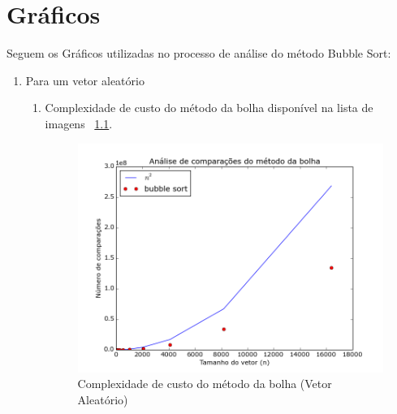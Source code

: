 \documentclass[12pt,a4paper,twoside]{report}
\begin{document}
\chapter{Gráficos}

Seguem os Gráficos utilizadas no processo de análise do método Bubble Sort:
\begin{enumerate}

	\item Para um vetor aleatório
	\begin{enumerate}
		\item Complexidade de custo do método da bolha disponível na lista de imagens ~\ref{fig:BubblePlot1A}.
		\begin{figure}[!h]
			\centering
			\includegraphics[scale=0.6]{../imagens/Bubble/bubble_plot_1_aleatorio.png}
			\caption{Complexidade de custo do método da bolha (Vetor Aleatório) \label{fig:BubblePlot1A}}
		\end{figure}
		

\end{enumerate}
\end{enumerate}
\end{document}
